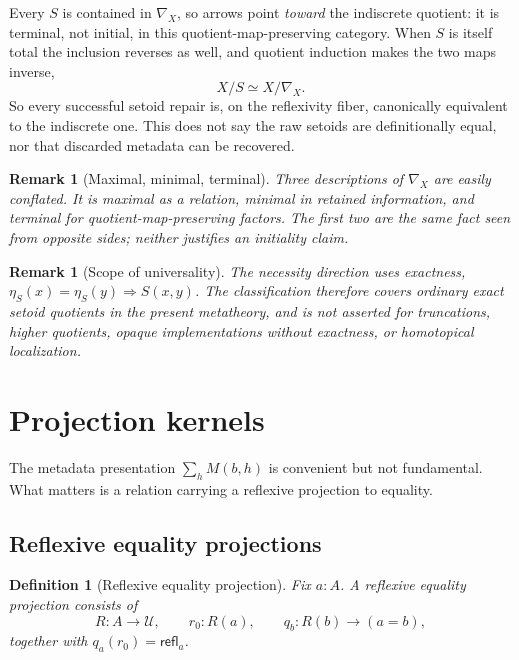 \documentclass[10pt,reqno]{amsart}
\newtheorem{definition}[theorem]{Definition}
\newtheorem{remark}[theorem]{Remark}
\newcommand{\U}{\mathcal U}
\newcommand{\Eqv}{\simeq}
\newcommand{\refl}{\mathsf{refl}}
\begin{document}
Every \(S\) is contained in \(\nabla_X\), so arrows point \emph{toward} the
indiscrete quotient: it is terminal, not initial, in this
quotient-map-preserving category.  When \(S\) is itself total the inclusion
reverses as well, and quotient induction makes the two maps inverse,
\[
 X/S\Eqv X/\nabla_X.
\tag{5.10}\label{eq:total-indiscrete-equiv}
\]
So every successful setoid repair is, on the reflexivity fiber, canonically
equivalent to the indiscrete one.  This does not say the raw setoids are
definitionally equal, nor that discarded metadata can be recovered.

\begin{remark}[Maximal, minimal, terminal]
\label{rem:terminal-not-initial}
Three descriptions of \(\nabla_X\) are easily conflated.  It is
\emph{maximal} as a relation, \emph{minimal} in retained information, and
\emph{terminal} for quotient-map-preserving factors.  The first two are the same
fact seen from opposite sides; neither justifies an initiality claim.
\end{remark}

\begin{remark}[Scope of universality]
\label{rem:quotient-scope}
The necessity direction uses exactness,
\(\eta_S(x)=\eta_S(y)\Rightarrow S(x,y)\).  The classification therefore covers
ordinary exact setoid quotients in the present metatheory, and is not asserted
for truncations, higher quotients, opaque implementations without exactness, or
homotopical localization.
\end{remark}

\section{Projection kernels}
\label{sec:projection-kernel}

The metadata presentation \(\sum_hM(b,h)\) is convenient but not fundamental.
What matters is a relation carrying a reflexive projection to equality.

\subsection{Reflexive equality projections}

\begin{definition}[Reflexive equality projection]
\label{def:reflexive-projection}
Fix \(a:A\).  A reflexive equality projection consists of
\[
 R:A\to\U,\qquad r_0:R(a),\qquad
 q_b:R(b)\to(a=b),
\tag{6.1}\label{eq:reflexive-projection}
\]
together with \(q_a(r_0)=\refl_a\).
\end{definition}
\end{document}
